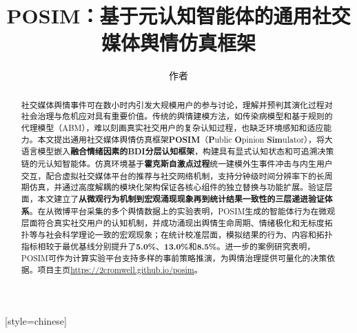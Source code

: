 \documentclass[a4paper,fleqn]{cas-sc}
\begin{document}
\let\WriteBookmarks\relax
\def\floatpagepagefraction{1}
\def\textpagefraction{.001}


\title [mode = title]{POSIM：基于元认知智能体的通用社交媒体舆情仿真框架}

\author[1]{作者}[style=chinese]
\cormark[1]
\ead{}



\begin{abstract}
社交媒体舆情事件可在数小时内引发大规模用户的参与讨论，理解并预判其演化过程对社会治理与危机应对具有重要价值。传统的舆情建模方法，如传染病模型和基于规则的代理模型（ABM），难以刻画真实社交用户的复杂认知过程，也缺乏环境感知和适应能力。本文提出通用社交媒体舆情仿真框架\textbf{POSIM}（\textbf{P}ublic \textbf{O}pinion \textbf{Sim}ulator），将大语言模型嵌入\textbf{融合情绪因素的BDI分层认知框架}，构建具有显式认知状态和可追溯决策链的元认知智能体。仿真环境基于\textbf{霍克斯自激点过程}统一建模外生事件冲击与内生用户交互，配合虚拟社交媒体平台的推荐与社交网络机制，支持分钟级时间分辨率下的长周期仿真，并通过高度解耦的模块化架构保证各核心组件的独立替换与功能扩展。验证层面，本文建立了\textbf{从微观行为机制到宏观涌现现象再到统计结果一致性的三层递进验证体系}。在从微博平台采集的多个舆情数据上的实验表明，POSIM生成的智能体行为在微观层面符合真实社交用户的认知机制，并成功涌现出舆情生命周期、情绪极化和无标度拓扑等与社会科学理论一致的宏观现象；在统计校准层面，模拟结果的行为、内容和拓扑指标相较于最优基线分别提升了\textbf{5.0\%}、\textbf{13.0\%}和\textbf{8.5\%}。进一步的案例研究表明，POSIM可作为计算实验平台支持多样的事前策略推演，为舆情治理提供可量化的决策依据。项目主页\url{https://2cromwell.github.io/posim}。
\end{abstract}

\end{document}
